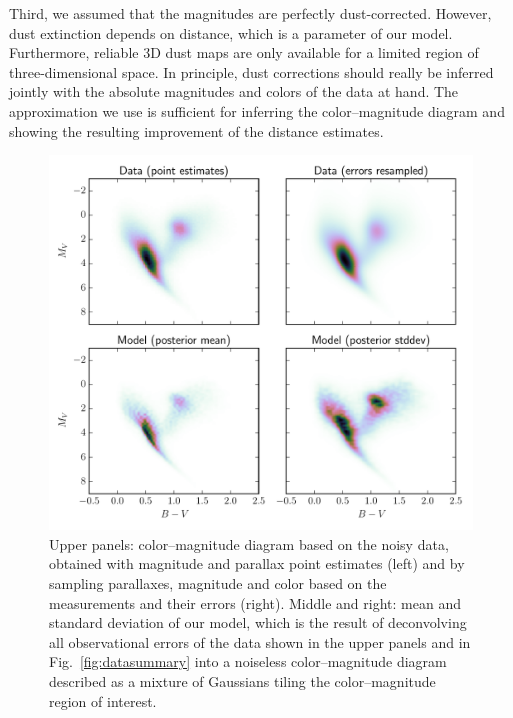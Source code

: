 \documentclass[manuscript, letterpaper]{aastex6}
\makeatletter
\let\origsection\section
\renewcommand\section{\@ifstar{\starsection}{\nostarsection}}
\newcommand\nostarsection[1]{\sectionprelude\origsection{#1}}
\newcommand\starsection[1]{\sectionprelude\origsection*{#1}}
\newcommand\sectionprelude{\vspace{1em}}
\newcommand{\figref}[1]{{\xspace}Fig.~\ref{#1}}
\makeatother
\begin{document}
Third, we assumed that the magnitudes are perfectly dust-corrected. 
However, dust extinction depends on distance, which is a parameter of our model.
Furthermore, reliable 3D dust maps are only available for a limited region of three-dimensional space.
In principle, dust corrections should really be inferred jointly with the absolute magnitudes and colors of the data at hand. 
The approximation we use is sufficient for inferring the color--magnitude diagram and showing the resulting improvement of the distance estimates.

\section{Application to Gaia TGAS}\label{sec:application}

\begin{figure}
\hspace*{-3mm}\includegraphics[width=15cm]{colmagdiag_mainsample.pdf}
\caption{Upper panels: color--magnitude diagram based on the noisy data, obtained with magnitude and parallax point estimates (left) and by sampling parallaxes, magnitude and color based on the measurements and their errors (right). Middle and right: mean and standard deviation of our model, which is the result of deconvolving all observational errors of the data shown in the upper panels and in \figref{fig:datasummary} into a noiseless color--magnitude diagram described as a mixture of Gaussians tiling the color--magnitude region of interest. }
\label{fig:colmagdiag_mainsample}
\end{figure}
\end{document}
